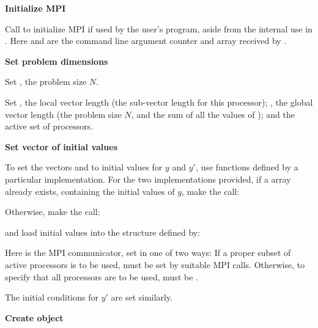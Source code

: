\begin{Steps}
  
\item 
  {\bf {\p} Initialize MPI}

  Call  to initialize MPI if used by
  the user's program, aside from the internal use in {\nvecp}.  
  Here  and  are the command line argument 
  counter and array received by .
  
\item
  {\bf Set problem dimensions}

  {\s} Set , the problem size $N$.

  {\p} Set , the local vector length (the sub-vector
  length for this processor); , the global vector length (the
  problem size $N$, and the sum of all the values of );
  and the active set of processors.
    
\item
  {\bf Set vector of initial values}
 
  To set the vectors  and  to initial values for $y$ and $y'$, 
  use functions defined by a particular {\nvector} implementation. 
  For the two {\nvector} implementations provided, if a  
  array  
  already exists, containing the initial values of $y$, make the call:

  {\s} 

  {\p} 

  Otherwise, make the call:

  {\s} 

  {\p} 

  and load initial values into the structure defined by:

  {\s} 

  {\p} 

  Here  is the MPI communicator, set in one of two ways: 
  If a proper subset of active processors is to be used,  
  must be set by suitable MPI calls. Otherwise, to specify that all 
  processors are to be used,  must be .
  
  The initial conditions for $y'$ are set similarly.

\item\label{i:ida_create} 
  {\bf Create {\ida} object}


\end{Steps}
